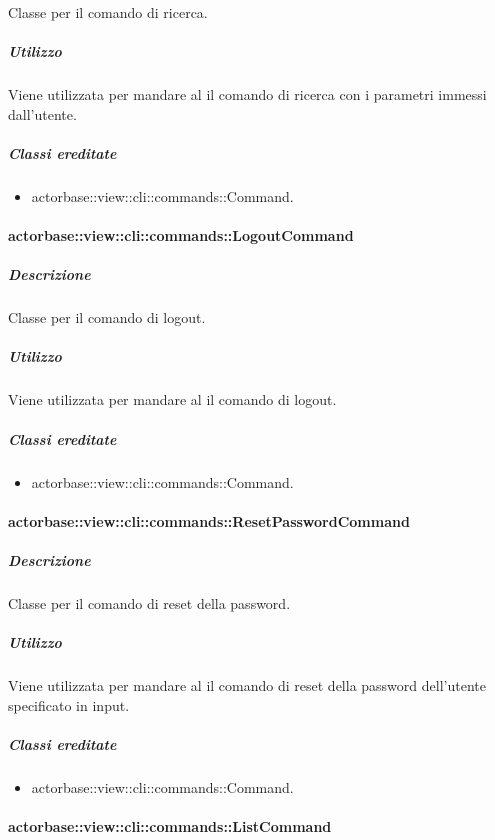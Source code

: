 \documentclass{scalatekids-article}
\begin{document}
Classe per il comando di ricerca.

\subparagraph{Utilizzo}

Viene utilizzata per mandare al  il comando di ricerca con i parametri immessi dall'utente.

\subparagraph{Classi ereditate}

\begin{itemize}
\item actorbase::view::cli::commands::Command.
\end{itemize}

\paragraph{actorbase::view::cli::commands::LogoutCommand}

\subparagraph{Descrizione}

Classe per il comando di logout.

\subparagraph{Utilizzo}

Viene utilizzata per mandare al  il comando di logout.

\subparagraph{Classi ereditate}

\begin{itemize}
\item actorbase::view::cli::commands::Command.
\end{itemize}

\paragraph{actorbase::view::cli::commands::ResetPasswordCommand}

\subparagraph{Descrizione}

Classe per il comando di reset della password.

\subparagraph{Utilizzo}

Viene utilizzata per mandare al  il comando di reset della password dell'utente specificato in input.

\subparagraph{Classi ereditate}

\begin{itemize}
\item actorbase::view::cli::commands::Command.
\end{itemize}

\paragraph{actorbase::view::cli::commands::ListCommand}
\end{document}
